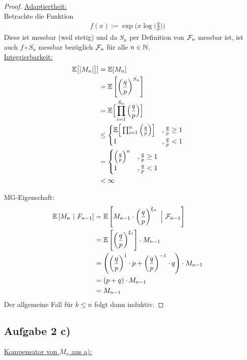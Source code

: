 \documentclass[12pt,a4paper]{article}
\begin{document}
\begin{proof}
	\underline{Adaptiertheit:}\\
	Betrachte die Funktion
	\begin{align*}
		f(x):= \exp\Big(x \log\Big(\frac{q}{p}\Big)\Big)
	\end{align*}
	Diese ist messbar (weil stetig) und da $S_n$ per Definition von $\mathcal{F}_n$ messbar ist, ist auch
	$f\circ S_n$ messbar bezüglich $\mathcal{F}_n$ für alle $n\in\mathbb{N}$.\\

	\underline{Integrierbarkeit:} %
	\begin{align*}
		\mathbb{E}\big[|M_n|\big]]
		&=\mathbb{E}[M_n]\\
		&= \mathbb{E}\left[\left(\frac{q}{p}\right)^{S_n}\right] \\
		&= \mathbb{E}\Big[\prod_{i=1}^{S_n}\Big(\frac{q}{p}\Big)\Big] \\
		&\leq\begin{cases}
		\mathbb{E}\Big[\prod_{i=1}^{n}\Big(\frac{q}{p}\Big)\Big] &,\frac{q}{p}\geq 1 \\
		1 &,\frac{q}{p} < 1 
	\end{cases} \\
		&=\begin{cases}
		\Big(\frac{q}{p}\Big)^n &,\frac{q}{p}\geq 1 \\
		1 &,\frac{q}{p} < 1 
	\end{cases} \\
	&< \infty
	\end{align*}

	MG-Eigenschaft:
	\begin{align*}
		\mathbb{E}\left[{M_n}~|~{F_{n-1}}\right]
		&=\mathbb{E}\left[M_{n-1}\cdot\left(\frac{q}{p}\right)^{\xi_n}~\Big|~\mathcal{F}_{n-1}\right] \\
		&=\mathbb{E}\left[\left(\frac{q}{p}\right)^{\xi_1}\right]\cdot M_{n-1} \\
		&=\left(\left(\frac{q}{p}\right)^1\cdot p + \left(\frac{q}{p}\right)^{-1}\cdot q\right)\cdot M_{n-1} \\
		&= (p+q)\cdot M_{n-1} \\
		&= M_{n-1}
	\end{align*}
Der allgemeine Fall für $k\leq n$ folgt dann induktiv.
\end{proof}

\subsection*{Aufgabe 2 c)}
\underline{Kompensator von $M_n$ aus a):}\\
\end{document}
